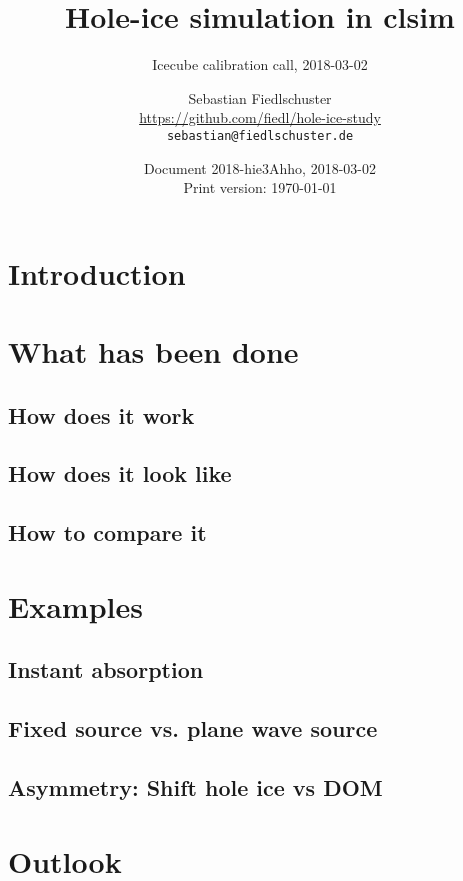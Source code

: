 \documentclass[green, 12pt]{beamer}
\title{Hole-ice simulation in clsim}
\subtitle{Icecube calibration call, 2018-03-02}
\date{Document 2018-hie3Ahho, 2018-03-02 \\ \tiny{Print version: \today}}
\author[Sebastian Fiedlschuster \texttt{<sebastian@fiedlschuster.de>}]{Sebastian Fiedlschuster \\ \tiny{\url{https://github.com/fiedl/hole-ice-study}} \\ \tiny\texttt{sebastian@fiedlschuster.de}}
\institute{Erlangen Centre for Astroparticle Physics}
\newif\ifplacelogo %
\begin{document}



\section{Introduction}
  
  
\placelogofalse

\section{What has been done}
\subsection{How does it work}
  
\subsection{How does it look like}
  
\subsection{How to compare it}
  

\section{Examples}
\subsection{Instant absorption}
  
\subsection{Fixed source vs. plane wave source}
  
  
\subsection{Asymmetry: Shift hole ice vs DOM}
  

\section{Outlook}
\end{document}
